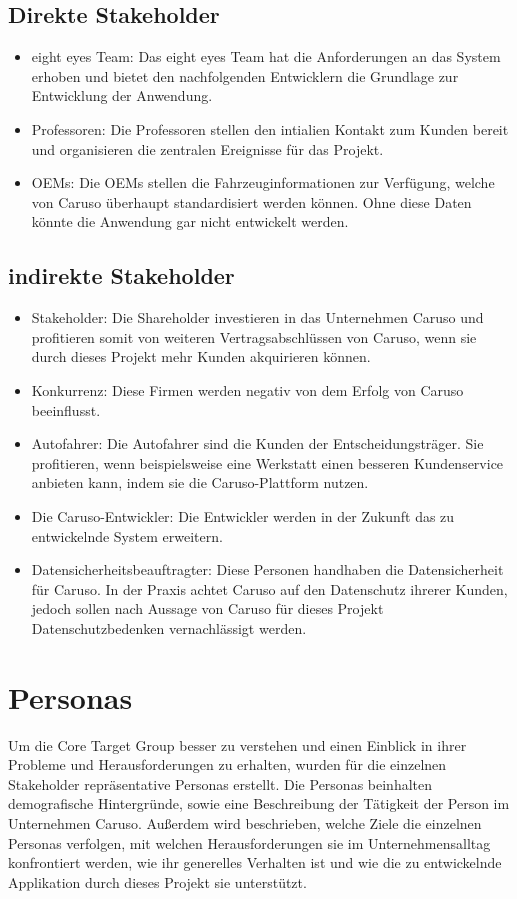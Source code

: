 \subsection{Direkte Stakeholder}
\begin{itemize}
  \item eight eyes Team: Das eight eyes Team hat die Anforderungen an das System erhoben und bietet den nachfolgenden Entwicklern die Grundlage zur Entwicklung der Anwendung.
  \item Professoren: Die Professoren stellen den intialien Kontakt zum Kunden bereit und organisieren die zentralen Ereignisse für das Projekt.
  \item OEMs: Die OEMs stellen die Fahrzeuginformationen zur Verfügung, welche von Caruso überhaupt standardisiert werden können. Ohne diese Daten könnte die Anwendung gar nicht entwickelt werden.
\end{itemize}
\subsection{indirekte Stakeholder}
\begin{itemize}
  \item Stakeholder: Die Shareholder investieren in das Unternehmen Caruso und profitieren somit von weiteren Vertragsabschlüssen von Caruso, wenn sie durch dieses Projekt mehr Kunden akquirieren können.
  \item Konkurrenz: Diese Firmen werden negativ von dem Erfolg von Caruso beeinflusst.
  \item Autofahrer: Die Autofahrer sind die Kunden der Entscheidungsträger. Sie profitieren, wenn beispielsweise eine Werkstatt einen besseren Kundenservice anbieten kann, indem sie die Caruso-Plattform nutzen.
  \item Die Caruso-Entwickler: Die Entwickler werden in der Zukunft das zu entwickelnde System erweitern.
  \item Datensicherheitsbeauftragter: Diese Personen handhaben die Datensicherheit für Caruso. In der Praxis achtet Caruso auf den Datenschutz ihrerer Kunden, jedoch sollen nach Aussage von Caruso für dieses Projekt Datenschutzbedenken vernachlässigt werden.
\end{itemize}

\section{Personas}
Um die Core Target Group besser zu verstehen und einen Einblick in ihrer Probleme und Herausforderungen zu erhalten, wurden für die einzelnen Stakeholder repräsentative Personas erstellt. Die Personas beinhalten demografische Hintergründe, sowie eine Beschreibung der Tätigkeit der Person im Unternehmen Caruso. Außerdem wird beschrieben, welche Ziele die einzelnen Personas verfolgen, mit welchen Herausforderungen sie im Unternehmensalltag konfrontiert werden, wie ihr generelles Verhalten ist und wie die zu entwickelnde Applikation durch dieses Projekt sie unterstützt.

